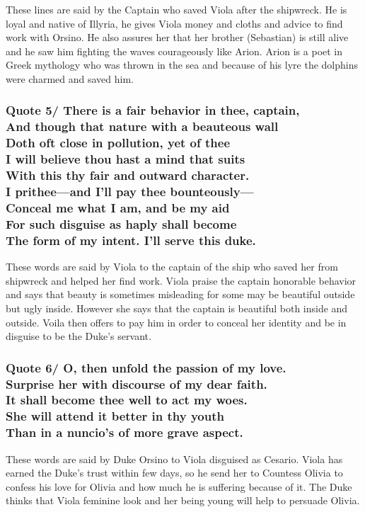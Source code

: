 \documentclass[12pt, a4paper]{article}
\begin{document}
These lines are said by the Captain who saved Viola after the shipwreck.
He is loyal and native of Illyria, he gives Viola money and cloths and
advice to find work with Orsino. He also assures her that her brother 
(Sebastian) is still alive and he saw 
him fighting the waves courageously like Arion. Arion is a poet in Greek
mythology who was thrown in the sea and because of his lyre the dolphins
were charmed and saved him.

\subsubsection*{Quote 5/
There is a fair behavior in thee, captain,\\
And though that nature with a beauteous wall\\
Doth oft close in pollution, yet of thee\\
I will believe thou hast a mind that suits\\
With this thy fair and outward character.\\
I prithee—and I’ll pay thee bounteously—\\
Conceal me what I am, and be my aid\\
For such disguise as haply shall become\\
The form of my intent. I’ll serve this duke.
}

These words are said by Viola to the captain of the ship who saved her
from shipwreck and helped her find work. Viola praise the captain 
honorable behavior and says that beauty is 
sometimes misleading for some may be beautiful outside but ugly inside.
However she says that the captain is beautiful both inside and outside.
Voila then offers to pay him in order to conceal her identity and be in
disguise to be the Duke's servant.

\subsubsection*{Quote 6/
O, then unfold the passion of my love.\\
Surprise her with discourse of my dear faith.\\
It shall become thee well to act my woes.\\
She will attend it better in thy youth\\
Than in a nuncio’s of more grave aspect.
}

These words are said by Duke Orsino to Viola disguised as Cesario.
Viola has earned the Duke's trust within few days, so he send her to 
Countess Olivia to confess his love for Olivia and how much he is 
suffering because of it. The Duke thinks that Viola feminine look and 
her being young will help to persuade Olivia.
\end{document}
